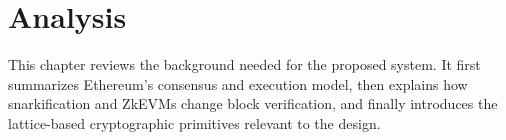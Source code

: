 \chapter{Analysis}\label{chap:analysis}

This chapter reviews the background needed for the proposed system. It first
summarizes Ethereum's consensus and execution model, then explains how
snarkification and ZkEVMs change block verification, and finally introduces the
lattice-based cryptographic primitives relevant to the design.








